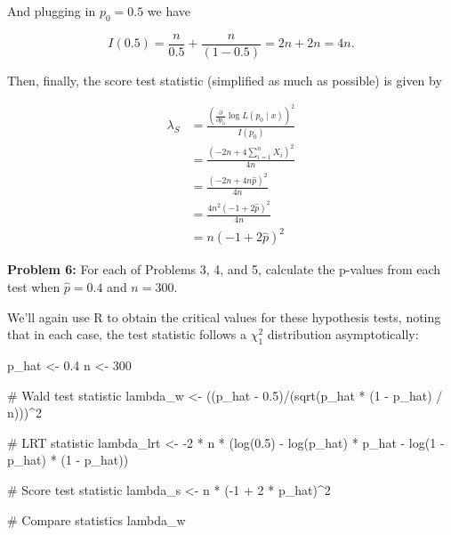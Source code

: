 \documentclass[
  letterpaper,
  DIV=11,
  numbers=noendperiod]{scrreprt}
\newenvironment{Shaded}{\begin{snugshade}}{\end{snugshade}}
\newcommand{\CommentTok}[1]{\textcolor[rgb]{0.37,0.37,0.37}{#1}}
\newcommand{\DecValTok}[1]{\textcolor[rgb]{0.68,0.00,0.00}{#1}}
\newcommand{\FloatTok}[1]{\textcolor[rgb]{0.68,0.00,0.00}{#1}}
\newcommand{\FunctionTok}[1]{\textcolor[rgb]{0.28,0.35,0.67}{#1}}
\newcommand{\NormalTok}[1]{\textcolor[rgb]{0.00,0.23,0.31}{#1}}
\newcommand{\OtherTok}[1]{\textcolor[rgb]{0.00,0.23,0.31}{#1}}
\newcommand{\SpecialCharTok}[1]{\textcolor[rgb]{0.37,0.37,0.37}{#1}}
\begin{document}
And plugging in \(p_0 = 0.5\) we have

\[
I(0.5) = \frac{n}{0.5}  + \frac{n}{(1 - 0.5)} = 2n + 2n = 4n.
\]

Then, finally, the score test statistic (simplified as much as possible)
is given by

\begin{align*}
    \lambda_S & = \frac{\left( \frac{\partial}{\partial p_0} \log L(p_0 \mid x) \right)^2}{I(p_0)} \\
    & = \frac{\left( -2n + 4\sum_{i = 1}^n X_i\right)^2}{4n} \\
    & = \frac{\left( -2n + 4n \hat{p}\right)^2}{4n} \\
    & = \frac{4n^2\left( -1 + 2 \hat{p}\right)^2}{4n} \\
    & = n\left( -1 + 2 \hat{p}\right)^2
\end{align*}

\textbf{Problem 6:} For each of Problems 3, 4, and 5, calculate the
p-values from each test when \(\hat{p} = 0.4\) and \(n = 300\).

We'll again use R to obtain the critical values for these hypothesis
tests, noting that in each case, the test statistic follows a
\(\chi^2_1\) distribution asymptotically:

\begin{Shaded}
\begin{Highlighting}[]
\NormalTok{p\_hat }\OtherTok{\textless{}{-}} \FloatTok{0.4}
\NormalTok{n }\OtherTok{\textless{}{-}} \DecValTok{300}

\CommentTok{\# Wald test statistic}
\NormalTok{lambda\_w }\OtherTok{\textless{}{-}}\NormalTok{ ((p\_hat }\SpecialCharTok{{-}} \FloatTok{0.5}\NormalTok{)}\SpecialCharTok{/}\NormalTok{(}\FunctionTok{sqrt}\NormalTok{(p\_hat }\SpecialCharTok{*}\NormalTok{ (}\DecValTok{1} \SpecialCharTok{{-}}\NormalTok{ p\_hat) }\SpecialCharTok{/}\NormalTok{ n)))}\SpecialCharTok{\^{}}\DecValTok{2}

\CommentTok{\# LRT statistic}
\NormalTok{lambda\_lrt }\OtherTok{\textless{}{-}} \SpecialCharTok{{-}}\DecValTok{2} \SpecialCharTok{*}\NormalTok{ n }\SpecialCharTok{*}\NormalTok{ (}\FunctionTok{log}\NormalTok{(}\FloatTok{0.5}\NormalTok{) }\SpecialCharTok{{-}} \FunctionTok{log}\NormalTok{(p\_hat) }\SpecialCharTok{*}\NormalTok{ p\_hat }\SpecialCharTok{{-}} \FunctionTok{log}\NormalTok{(}\DecValTok{1} \SpecialCharTok{{-}}\NormalTok{ p\_hat) }\SpecialCharTok{*}\NormalTok{ (}\DecValTok{1} \SpecialCharTok{{-}}\NormalTok{ p\_hat))}

\CommentTok{\# Score test statistic}
\NormalTok{lambda\_s }\OtherTok{\textless{}{-}}\NormalTok{ n }\SpecialCharTok{*}\NormalTok{ (}\SpecialCharTok{{-}}\DecValTok{1} \SpecialCharTok{+} \DecValTok{2} \SpecialCharTok{*}\NormalTok{ p\_hat)}\SpecialCharTok{\^{}}\DecValTok{2}

\CommentTok{\# Compare statistics}
\NormalTok{lambda\_w}
\end{Highlighting}
\end{Shaded}
\end{document}
